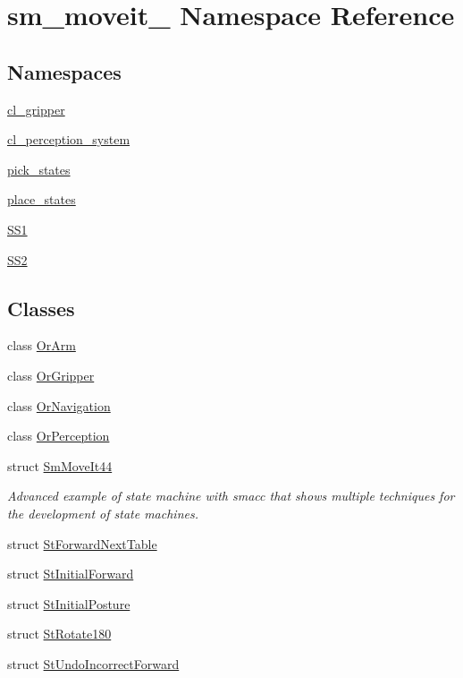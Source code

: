 \hypertarget{namespacesm__moveit__4}{}\section{sm\+\_\+moveit\+\_ Namespace Reference}
\label{namespacesm__moveit__4}
\subsection*{Namespaces}
\begin{DoxyCompactItemize}
\item 
 \hyperlink{namespacesm__moveit__4_1_1cl__gripper}{cl\+\_\+gripper}
\item 
 \hyperlink{namespacesm__moveit__4_1_1cl__perception__system}{cl\+\_\+perception\+\_\+system}
\item 
 \hyperlink{namespacesm__moveit__4_1_1pick__states}{pick\+\_\+states}
\item 
 \hyperlink{namespacesm__moveit__4_1_1place__states}{place\+\_\+states}
\item 
 \hyperlink{namespacesm__moveit__4_1_1SS1}{S\+S1}
\item 
 \hyperlink{namespacesm__moveit__4_1_1SS2}{S\+S2}
\end{DoxyCompactItemize}
\subsection*{Classes}
\begin{DoxyCompactItemize}
\item 
class \hyperlink{classsm__moveit__4_1_1OrArm}{Or\+Arm}
\item 
class \hyperlink{classsm__moveit__4_1_1OrGripper}{Or\+Gripper}
\item 
class \hyperlink{classsm__moveit__4_1_1OrNavigation}{Or\+Navigation}
\item 
class \hyperlink{classsm__moveit__4_1_1OrPerception}{Or\+Perception}
\item 
struct \hyperlink{structsm__moveit__4_1_1SmMoveIt44}{Sm\+Move\+It44}
\begin{DoxyCompactList}\small\item\em Advanced example of state machine with smacc that shows multiple techniques for the development of state machines. \end{DoxyCompactList}\item 
struct \hyperlink{structsm__moveit__4_1_1StForwardNextTable}{St\+Forward\+Next\+Table}
\item 
struct \hyperlink{structsm__moveit__4_1_1StInitialForward}{St\+Initial\+Forward}
\item 
struct \hyperlink{structsm__moveit__4_1_1StInitialPosture}{St\+Initial\+Posture}
\item 
struct \hyperlink{structsm__moveit__4_1_1StRotate180}{St\+Rotate180}
\item 
struct \hyperlink{structsm__moveit__4_1_1StUndoIncorrectForward}{St\+Undo\+Incorrect\+Forward}
\end{DoxyCompactItemize}
